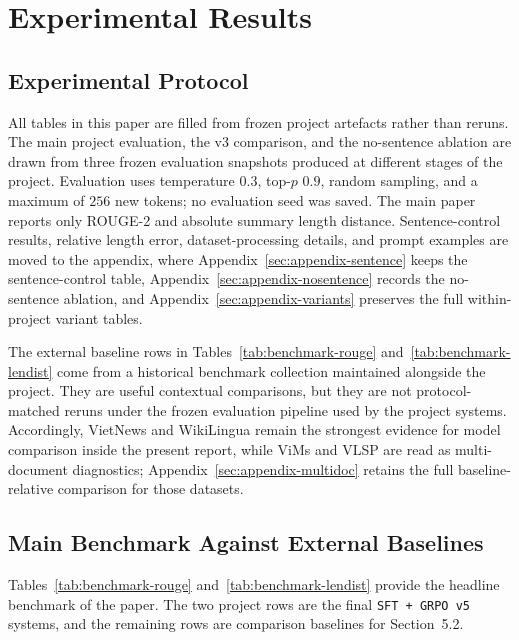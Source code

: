 \documentclass[11pt]{article}
\begin{document}
\section{Experimental Results}
\subsection{Experimental Protocol}
All tables in this paper are filled from frozen project artefacts rather than reruns.
The main project evaluation, the v3 comparison, and the no-sentence ablation are drawn from three frozen evaluation snapshots produced at different stages of the project.
Evaluation uses temperature $0.3$, top-$p$ $0.9$, random sampling, and a maximum of $256$ new tokens; no evaluation seed was saved.
The main paper reports only ROUGE-2 and absolute summary length distance.
Sentence-control results, relative length error, dataset-processing details, and prompt examples are moved to the appendix, where Appendix~\ref{sec:appendix-sentence} keeps the sentence-control table, Appendix~\ref{sec:appendix-nosentence} records the no-sentence ablation, and Appendix~\ref{sec:appendix-variants} preserves the full within-project variant tables.

The external baseline rows in Tables~\ref{tab:benchmark-rouge} and~\ref{tab:benchmark-lendist} come from a historical benchmark collection maintained alongside the project.
They are useful contextual comparisons, but they are not protocol-matched reruns under the frozen evaluation pipeline used by the project systems.
Accordingly, VietNews and WikiLingua remain the strongest evidence for model comparison inside the present report, while ViMs and VLSP are read as multi-document diagnostics; Appendix~\ref{sec:appendix-multidoc} retains the full baseline-relative comparison for those datasets.

\subsection{Main Benchmark Against External Baselines}
Tables~\ref{tab:benchmark-rouge} and~\ref{tab:benchmark-lendist} provide the headline benchmark of the paper.
The two project rows are the final \texttt{SFT + GRPO v5} systems, and the remaining rows are comparison baselines for Section~5.2.
\end{document}
